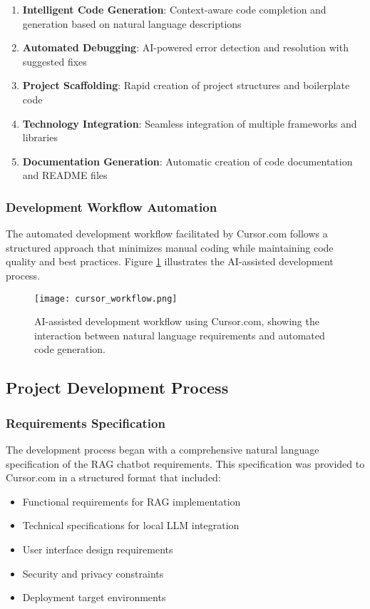 \begin{enumerate}
    \item \textbf{Intelligent Code Generation}: Context-aware code completion and generation based on natural language descriptions
    \item \textbf{Automated Debugging}: AI-powered error detection and resolution with suggested fixes
    \item \textbf{Project Scaffolding}: Rapid creation of project structures and boilerplate code
    \item \textbf{Technology Integration}: Seamless integration of multiple frameworks and libraries
    \item \textbf{Documentation Generation}: Automatic creation of code documentation and README files
\end{enumerate}

\subsubsection{Development Workflow Automation}

The automated development workflow facilitated by Cursor.com follows a structured approach that minimizes manual coding while maintaining code quality and best practices. Figure \ref{fig:cursor_workflow} illustrates the AI-assisted development process.

\begin{figure}[H]
    \centering
    \texttt{[image: cursor\_workflow.png]}
    \caption{AI-assisted development workflow using Cursor.com, showing the interaction between natural language requirements and automated code generation.}
    \label{fig:cursor_workflow}
\end{figure}

\subsection{Project Development Process}

\subsubsection{Requirements Specification}

The development process began with a comprehensive natural language specification of the RAG chatbot requirements. This specification was provided to Cursor.com in a structured format that included:

\begin{itemize}
    \item Functional requirements for RAG implementation
    \item Technical specifications for local LLM integration
    \item User interface design requirements
    \item Security and privacy constraints
    \item Deployment target environments
\end{itemize}


